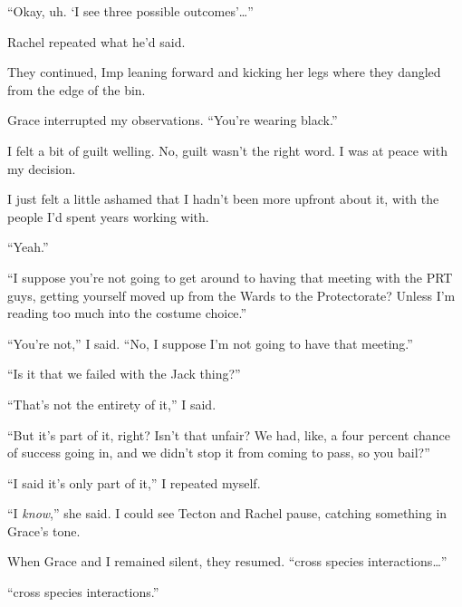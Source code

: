 ``Okay, uh.  `I see three possible outcomes'\ldots''



Rachel repeated what he'd said.



They continued, Imp leaning forward and kicking her legs where they dangled from the edge of the bin.



Grace interrupted my observations.  ``You're wearing black.''



I felt a bit of guilt welling.  No, guilt wasn't the right word.  I was at peace with my decision.



I just felt a little ashamed that I hadn't been more upfront about it, with the people I'd spent years working with.



``Yeah.''



``I suppose you're not going to get around to having that meeting with the PRT guys, getting yourself moved up from the Wards to the Protectorate?  Unless I'm reading too much into the costume choice.''



``You're not,'' I said.  ``No, I suppose I'm not going to have that meeting.''



``Is it that we failed with the Jack thing?''



``That's not the entirety of it,'' I said.



``But it's part of it, right?  Isn't that unfair?  We had, like, a four percent chance of success going in, and we didn't stop it from coming to pass, so you bail?''



``I said it's only part of it,'' I repeated myself.



``I \emph{know},'' she said.  I could see Tecton and Rachel pause, catching something in Grace's tone.



When Grace and I remained silent, they resumed.  ``\ldotsthe cross species interactions\ldots''



``\ldotsthe cross species interactions.''



